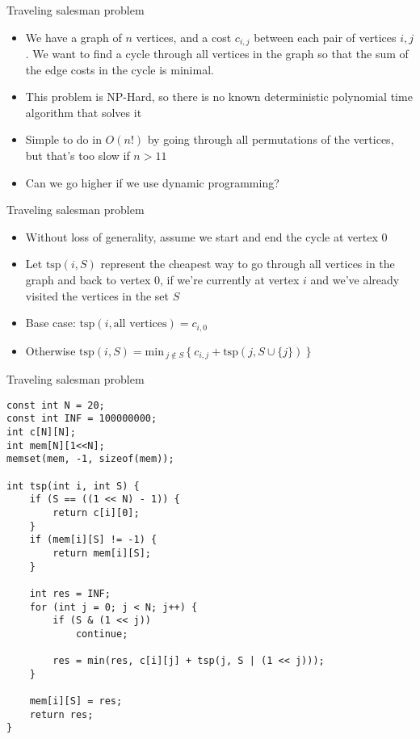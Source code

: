 \documentclass[12pt,t]{beamer}
\newcommand{\bi}{\begin{itemize}}
\newcommand{\ei}{\end{itemize}}
\begin{document}
\begin{frame}{Traveling salesman problem}
    \vspace{10pt}

    \bi
        \item We have a graph of $n$ vertices, and a cost $c_{i,j}$ between each pair of vertices $i, j$. We want to find a cycle through all vertices in the graph so that the sum of the edge costs in the cycle is minimal.

        \vspace{5pt}
        \item This problem is NP-Hard, so there is no known deterministic polynomial time algorithm that solves it

        \vspace{10pt}
        \item Simple to do in $O(n!)$ by going through all permutations of the vertices, but that's too slow if $n > 11$

        \vspace{10pt}
        \item Can we go higher if we use dynamic programming?
    \ei
\end{frame}

\begin{frame}{Traveling salesman problem}
    \vspace{20pt}
    \bi
\item Without loss of generality, assume we start and end the cycle at vertex $0$
    \vspace{10pt}

\item Let $\mathrm{tsp}(i, S)$ represent the cheapest way to go through all vertices in the graph and back to vertex $0$, if we're currently at vertex $i$ and we've already visited the vertices in the set $S$

    \vspace{20pt}
\item Base case: $\mathrm{tsp}(i, \textrm{all vertices}) = c_{i,0}$
\item Otherwise $\mathrm{tsp}(i, S) = \mathrm{min}_{\ j \not\in S\ } \{\ c_{i,j} + \mathrm{tsp}(j, S \cup \{j\})\ \}$
    \ei
\end{frame}

\begin{frame}[fragile]{Traveling salesman problem}
    \begin{verbatim}
const int N = 20;
const int INF = 100000000;
int c[N][N];
int mem[N][1<<N];
memset(mem, -1, sizeof(mem));

int tsp(int i, int S) {
    if (S == ((1 << N) - 1)) {
        return c[i][0];
    }
    if (mem[i][S] != -1) {
        return mem[i][S];
    }

    int res = INF;
    for (int j = 0; j < N; j++) {
        if (S & (1 << j))
            continue;

        res = min(res, c[i][j] + tsp(j, S | (1 << j)));
    }

    mem[i][S] = res;
    return res;
}
    \end{verbatim}
\end{frame}
\end{document}
